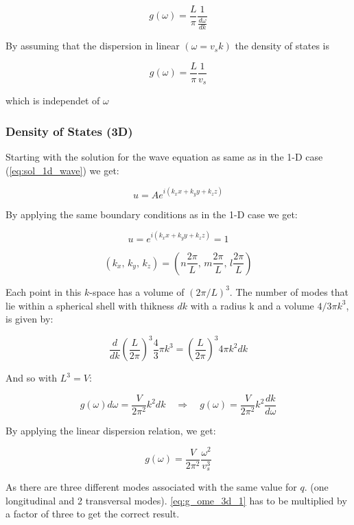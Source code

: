 \begin{equation}
    g(\omega) = \frac{L}{\pi} \frac{1}{\frac{d\omega}{d k}}
\end{equation}

By assuming that the dispersion in linear $(\omega = v_sk)$ 
the density of states is

\begin{equation}
    g(\omega) = \frac{L}{\pi} \frac{1}{v_s}
\end{equation}

which is independet of $\omega$

\subsubsection*{Density of States (3D)}

Starting with the solution for the wave equation as same as in the 1-D case
(\autoref{eq:sol_1d_wave}) we get:

\begin{equation}
    u = Ae^{i(k_x x + k_y y + k_z z)}
\end{equation}

By applying the same boundary conditions as in the 1-D case we get:

$$u = e^{i(k_x x + k_y y + k_z z)} = 1$$

$$(k_x, \, k_y,\, k_z) = (n \frac{2\pi}{L}, \, m \frac{2\pi}{L}, \, l \frac{2\pi}{L})$$

Each point in this $k$-space has a volume of $(2\pi/L)^3$. The number of
modes that lie within a spherical shell with thikness $dk$ with a radius k 
and a volume $4/3\pi k^3$, is given by:

$$\frac{d}{dk}{(\frac{L}{2\pi})}^3\frac{4}{3}\pi k^3 = {(\frac{L}{2\pi})}^3 4\pi k^2 dk$$

And so with $L^3 = V$:

$$ g(\omega) d \omega =  \frac{V}{2\pi^2} k^2 dk \quad \Rightarrow \quad g(\omega) = \frac{V}{2\pi^2} k^2 \frac{dk}{d \omega} $$

By applying the linear dispersion relation, we get:

\begin{equation}
    g(\omega) = \frac{V}{2\pi^2} \frac{\omega^2}{v_s^3}
    \label{eq:g_ome_3d_1}
\end{equation}

As there are three different modes associated with the same value for $q$.
(one longitudinal and 2 transversal modes). \autoref{eq:g_ome_3d_1} has to be
multiplied by a factor of three to get the correct result.

